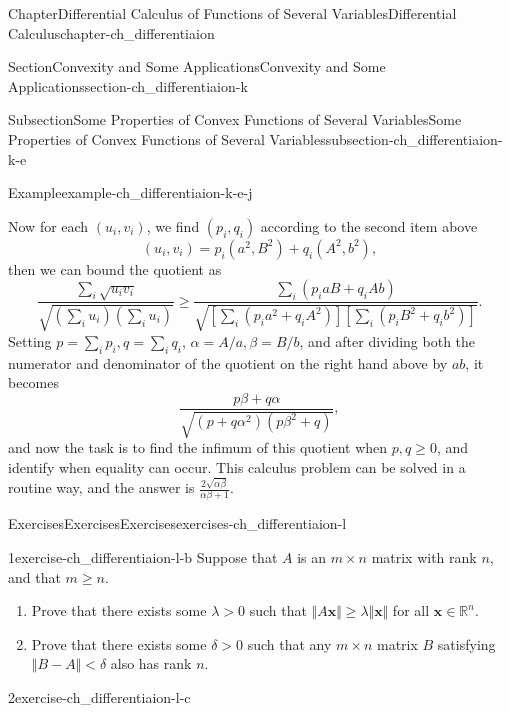 \documentclass[oneside,10pt,]{book}
\numberwithin{equation}{section}
\newcommand{\bx}{\mathbf{x}}
\newcommand{\bbR}{\mathbb{R}}
\newcommand{\lt}{<}
\newcommand{\gt}{>}
\begin{document}
\begin{chapterptx}{Chapter}{Differential Calculus of Functions of Several Variables}{}{Differential Calculus}{}{}{chapter-ch_differentiaion}
\begin{sectionptx}{Section}{Convexity and Some Applications}{}{Convexity and Some Applications}{}{}{section-ch_differentiaion-k}
\begin{subsectionptx}{Subsection}{Some Properties of Convex Functions of Several Variables}{}{Some Properties of Convex Functions of Several Variables}{}{}{subsection-ch_differentiaion-k-e}
\begin{example}{Example}{}{example-ch_differentiaion-k-e-j}
\par
Now for each \((u_{i}, v_{i})\), we find \((p_{i}, q_{i})\) according to the second item above%
\begin{equation*}
(u_{i}, v_{i})= p_{i} (a^2, B^2) + q_{i}(A^2, b^2),
\end{equation*}
then we can bound the quotient as%
\begin{equation*}
\frac{\sum_{i}  \sqrt{u_{i} v_{i}}}{\sqrt{(\sum_{i} u_{i}) (\sum_{i} u_{i})}}\ge 
\frac{\sum_{i} (p_{i} aB+ q_{i} Ab)}
{\sqrt{[\sum_{i} (p_{i} a^2 +q_{i} A^{2})][ \sum_{i} (p_{i}B^{2}+q_{i}b^{2})]}}.
\end{equation*}
Setting \(p=\sum_{i} p_{i}, q=\sum_{i} q_{i}\), \(\alpha=A/a, \beta=B/b\),  and after dividing  both the numerator and denominator of the quotient  on the right hand above by \(ab\), it  becomes%
\begin{equation*}
\frac{p \beta + 	q \alpha}{\sqrt{ (p +q \alpha^{2})(p\beta^{2}+q)}},
\end{equation*}
and now the task is to find the infimum of this quotient when \(p, q\ge 0\), and identify when equality can occur. This calculus problem can be solved in a routine way, and the answer is \(\frac{2\sqrt{\alpha \beta}}{ \alpha \beta+1}\).%
\end{example}
\end{subsectionptx}
\end{sectionptx}
%
%
\typeout{************************************************}
\typeout{************************************************}
%
\begin{exercises-section}{Exercises}{Exercises}{}{Exercises}{}{}{exercises-ch_differentiaion-l}
\begin{divisionexercise}{1}{}{}{exercise-ch_differentiaion-l-b}%
Suppose that \(A\) is an \(m\times n\) matrix with rank \(n\), and that \(m\ge n\).%
\begin{enumerate}[label=(\alph*).]
\item{}Prove that there exists some \(\lambda \gt 0\) such that \(\Vert A\bx \Vert \ge \lambda \Vert\bx \Vert\) for all \(\bx\in \bbR^{n}\).%
\item{}Prove that there exists some \(\delta >0\) such that any \(m\times n\) matrix \(B\) satisfying \(\Vert B-A\Vert \lt \delta\) also has rank \(n\).%
\end{enumerate}
%
\end{divisionexercise}%
\begin{divisionexercise}{2}{}{}{exercise-ch_differentiaion-l-c}%

\end{divisionexercise}
\end{exercises-section}
\end{chapterptx}
\end{document}
